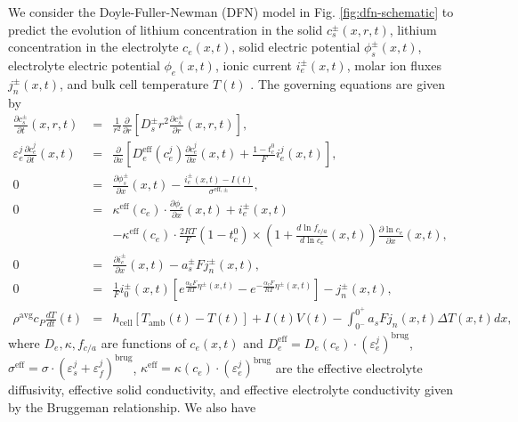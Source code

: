 \documentclass[12pt]{article}
\begin{document}
We consider the Doyle-Fuller-Newman (DFN) model in Fig. \ref{fig:dfn-schematic} to predict the evolution of lithium concentration in the solid $c_{s}^{\pm}(x,r,t)$, lithium concentration in the electrolyte $c_{e}(x,t)$, solid electric potential $\phi_{s}^{\pm}(x,t)$, electrolyte electric potential $\phi_{e}(x,t)$, ionic current $i_{e}^{\pm}(x,t)$, molar ion fluxes $j_{n}^{\pm}(x,t)$, and bulk cell temperature $T(t)$ \cite{Thomas2002}. The governing equations are given by
\begin{eqnarray}
	\frac{\partial c_{s}^{\pm}}{\partial t}(x,r,t) &=& \frac{1}{r^{2}} \frac{\partial}{\partial r} \left[ D_{s}^{\pm} r^{2} \frac{\partial c_{s}^{\pm}}{\partial r}(x,r,t) \right], \label{eqn:cs} \\
	 \varepsilon_{e}^{j} \frac{\partial c_{e}^{j}}{\partial t}(x,t) &=& \frac{\partial}{\partial x} \left[D_{e}^{\text{eff}}(c_{e}^{j}) \frac{\partial c_{e}^{j}}{\partial x}(x,t) + \frac{1 - t_{c}^{0}}{F} i_{e}^{j}(x,t) \right], \ \label{eqn:ce} \\
	0 &=& \frac{\partial \phi_{s}^{\pm}}{\partial x}(x,t) - \frac{i_{e}^{\pm}(x,t) - I(t)}{\sigma^{\text{eff},\pm}}, \label{eqn:phis} \\
	0 &=& \kappa^{\text{eff}}(c_{e}) \cdot \frac{\partial \phi_{e}}{\partial x}(x,t) + i_{e}^{\pm}(x,t) \nonumber \\
	&& - \kappa^{\text{eff}}(c_{e}) \cdot \frac{2RT}{F}(1 - t_{c}^{0}) \times \left(1 + \frac{d \ln f_{c/a}}{d \ln c_{e}}(x,t) \right) \frac{\partial \ln c_{e}}{\partial x}(x,t), \label{eqn:phie}  \quad \\
%
	0 &=& \frac{\partial i_{e}^{\pm}}{\partial x}(x,t) - a_{s}^{\pm} F j_{n}^{\pm}(x,t), \label{eqn:ie} \\
	0 &=& \frac{1}{F} i_{0}^{\pm}(x,t) \left[e^{\frac{\alpha_{a}F}{RT} \eta^{\pm}(x,t)} - e^{-\frac{\alpha_{c}F}{RT} \eta^{\pm}(x,t)} \right] - j_{n}^{\pm}(x,t), \label{eqn:bv} \\
	\rho^{\textrm{avg}} c_{P} \frac{dT}{dt}(t) &=& h_{\textrm{cell}} \left[ T_{\textrm{amb}}(t) - T(t) \right] + I(t) V(t) -\int_{0^{-}}^{0^{+}} a_{s} F j_{n}(x,t) \Delta T(x,t) dx, \label{eqn:T}
\end{eqnarray}
where $D_{e}, \kappa, f_{c/a}$ are functions of $c_{e}(x,t)$ and \noindent $D_{e}^{\text{eff}} = D_{e}(c_{e}) \cdot (\varepsilon_{e}^{j})^{\text{brug}}$, $\sigma^{\text{eff}} = \sigma \cdot (\varepsilon_{s}^{j} + \varepsilon_{f}^{j})^{\text{brug}}$, $\kappa^{\text{eff}} = \kappa(c_{e}) \cdot (\varepsilon_{e}^{j})^{\text{brug}}$ are the effective electrolyte diffusivity, effective solid conductivity, and effective electrolyte conductivity given by the Bruggeman relationship. We also have
\end{document}
